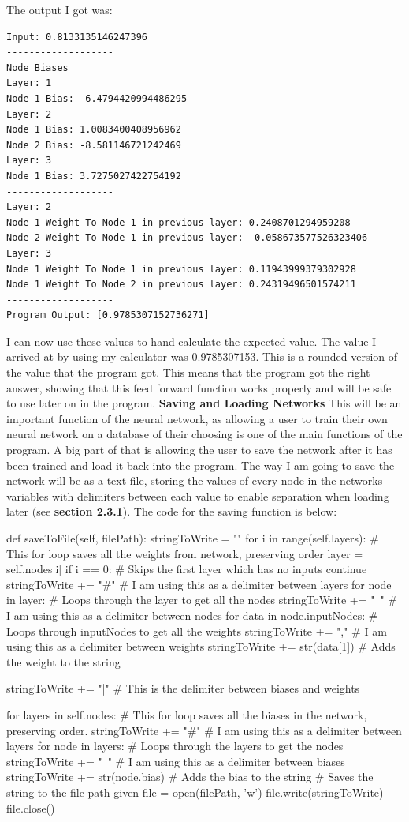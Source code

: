 \documentclass{report}
\begin{document}
The output I got was:
\begin{verbatim}
Input: 0.8133135146247396
-------------------
Node Biases
Layer: 1
Node 1 Bias: -6.4794420994486295
Layer: 2
Node 1 Bias: 1.0083400408956962
Node 2 Bias: -8.581146721242469
Layer: 3
Node 1 Bias: 3.7275027422754192
-------------------
Layer: 2
Node 1 Weight To Node 1 in previous layer: 0.2408701294959208
Node 2 Weight To Node 1 in previous layer: -0.058673577526323406
Layer: 3
Node 1 Weight To Node 1 in previous layer: 0.11943999379302928
Node 1 Weight To Node 2 in previous layer: 0.24319496501574211
-------------------
Program Output: [0.9785307152736271]
\end{verbatim}
I can now use these values to hand calculate the expected value. The value I arrived at by using my calculator was 0.9785307153. This is a rounded version of the value that the program got. This means that the program got the right answer, showing that this feed forward function works properly and will be safe to use later on in the program.
\newpage
\noindent \textbf{Saving and Loading Networks}
\newline
\newline
This will be an important function of the neural network, as allowing a user to train their own neural network on a database of their choosing is one of the main functions of the program. A big part of that is allowing the user to save the network after it has been trained and load it back into the program. The way I am going to save the network will be as a text file, storing the values of every node in the networks variables with delimiters between each value to enable separation when loading later (see \textbf{section 2.3.1}). The code for the saving function is below:
\begin{python}
def saveToFile(self, filePath):
    stringToWrite = ""
    for i in range(self.layers): # This for loop saves all the weights from network, preserving order
        layer = self.nodes[i]
        if i == 0: # Skips the first layer which has no inputs
            continue
        stringToWrite += "#" # I am using this as a delimiter between layers
        for node in layer: # Loops through the layer to get all the nodes
            stringToWrite += "~" # I am using this as a delimiter between nodes
            for data in node.inputNodes: # Loops through inputNodes to get all the weights
                stringToWrite += "," # I am using this as a delimiter between weights
                stringToWrite += str(data[1]) # Adds the weight to the string

    stringToWrite += "|" # This is the delimiter between biases and weights
    
    for layers in self.nodes: # This for loop saves all the biases in the network, preserving order.
        stringToWrite += "#" # I am using this as a delimiter between layers
        for node in layers: # Loops through the layers to get the nodes
            stringToWrite += "~" # I am using this as a delimiter between biases
            stringToWrite += str(node.bias) # Adds the bias to the string
    # Saves the string to the file path given
    file = open(filePath, 'w')
    file.write(stringToWrite)
    file.close()
\end{python}
\end{document}
